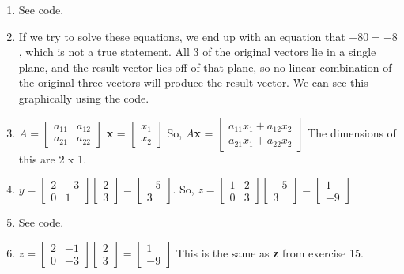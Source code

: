 \documentclass{article}
\begin{document}
\begin{enumerate}
	\item See code. 
	
	\item If we try to solve these equations, we end up with an equation that $-80=-8$, which is not a true statement. All 3 of the original vectors lie in a single plane, and the result vector lies off of that plane, so no linear combination of the original three vectors will produce the result vector. We can see this graphically using the code.
	
	\item $A = 
	\begin{bmatrix}
		a_{11}	& a_{12} \\
		a_{21}	& a_{22} 
	\end{bmatrix}
	$
	\textbf{x} = 
	$
	\begin{bmatrix}
		x_1\\
		x_2
	\end{bmatrix}
	$
	So, $A$\textbf{x} = 
	$
	\begin{bmatrix}
		a_{11}x_1 + a_{12}x_2\\
		a_{21}x_1 + a_{22}x_2
	\end{bmatrix}
	$
	The dimensions of this are 2 x 1. 
	
	\item $y = 
	\begin{bmatrix}
		2	& -3 \\
		0	& 1 
	\end{bmatrix}
	\begin{bmatrix}
		2\\
		3
	\end{bmatrix}
	= 
	\begin{bmatrix}
		-5\\
		3
	\end{bmatrix}
	$. So, $z = 
	\begin{bmatrix}
		1	& 2\\
		0	&3
	\end{bmatrix}
	\begin{bmatrix}
		-5\\
		3
	\end{bmatrix}
	= 
	\begin{bmatrix}
		1\\
		-9
	\end{bmatrix}
	$

	\item See code. 
	
	\item $z = 
	\begin{bmatrix}
		2	& -1\\
		0	&-3
	\end{bmatrix}
	\begin{bmatrix}
		2\\
		3
	\end{bmatrix}
	= 
	\begin{bmatrix}
		1\\
		-9
	\end{bmatrix}
	$
	This is the same as \textbf{z} from exercise 15.
	

\end{enumerate}
\end{document}
